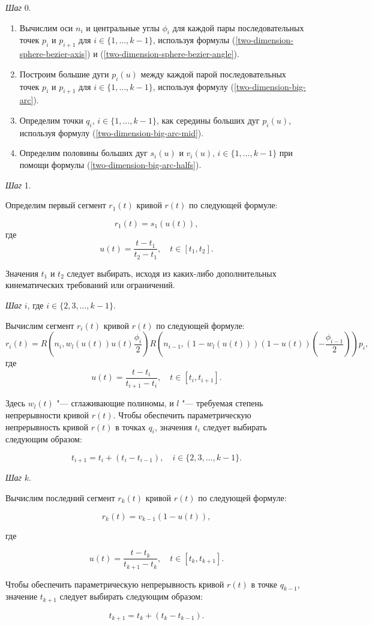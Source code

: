\bigskip
\textit{Шаг} 0.

\begin{enumerate}
\item Вычислим оси $n_i$ и центральные углы $\phi_i$ для каждой пары последовательных точек $p_i$ и $p_{i+1}$ для
$i \in \{1,\dots,k-1\}$, используя формулы (\ref{two-dimension-sphere-bezier-axis}) и
(\ref{two-dimension-sphere-bezier-angle}).
\item Построим большие дуги $p_i(u)$ между каждой парой последовательных точек $p_i$ и $p_{i+1}$ для
$i \in \{1,\dots,k-1\}$, используя формулу (\ref{two-dimension-big-arc}).
\item Определим точки $q_i$, $i \in \{1,\dots,k-1\}$, как середины больших дуг $p_i(u)$, используя формулу
(\ref{two-dimension-big-arc-mid}).
\item Определим половины больших дуг $s_i(u)$ и $v_i(u)$, $i \in \{1,\dots,k-1\}$ при помощи формулы
(\ref{two-dimension-big-arc-halfs}).
\end{enumerate}

\bigskip
\textit{Шаг} 1.

Определим первый сегмент $r_1(t)$ кривой $r(t)$ по следующей формуле:

$$
r_1(t)=s_1(u(t)),
$$
\noindent где
$$
u(t)=\frac{t-t_1}{t_2-t_1}, \quad t \in [t_1,t_2].
$$

Значения $t_1$ и $t_2$ следует выбирать, исходя из каких-либо дополнительных кинематических требований или ограничений.

\bigskip
\textit{Шаг} $i$, где $i \in \{2,3,\dots,k-1\}$.

Вычислим сегмент $r_i(t)$ кривой $r(t)$ по следующей формуле:
$$
r_i(t)=R(n_i,w_l(u(t))u(t)\frac{\phi_i}{2})R(n_{i-1},(1-w_l(u(t)))(1-u(t))(-\frac{\phi_{i-1}}{2}))p_i,
$$
\noindent где
$$
u(t)=\frac{t-t_i}{t_{i+1}-t_i}, \quad t \in [t_i,t_{i+1}].
$$

Здесь $w_l(t)$ "--- сглаживающие полиномы, и $l$ "--- требуемая степень непрерывности кривой $r(t)$. Чтобы обеспечить
параметрическую непрерывность кривой $r(t)$ в точках $q_i$, значения $t_i$ следует выбирать следующим образом:

$$
t_{i+1}=t_i+(t_i-t_{i-1}), \quad i \in \{2,3,\dots,k-1\}.
$$

\bigskip
\textit{Шаг} $k$.

Вычислим последний сегмент $r_k(t)$ кривой $r(t)$ по следующей формуле:

$$
r_k(t)=v_{k-1}(1-u(t)),
$$

\noindent где

$$
u(t)=\frac{t-t_k}{t_{k+1}-t_k}, \quad t \in [t_k,t_{k+1}].
$$

Чтобы обеспечить параметрическую непрерывность кривой $r(t)$ в точке $q_{k-1}$, значение $t_{k+1}$ следует выбирать
следующим образом:

$$
t_{k+1}=t_k+(t_k-t_{k-1}).
$$
